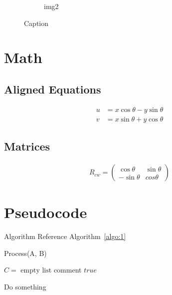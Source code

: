 \documentclass[english]{article}
\begin{document}
\begin{figure}[!htb]
\begin{subfigure}{.45\textwidth}
    \centering
    \caption{img2}
    \label{fig:1.2}
  \end{subfigure}
  \centering
  \caption{Caption}
  \label{fig:1}
\end{figure}


\clearpage
\pagebreak
\section{Math}

\subsection{Aligned Equations}

\begin{align*}
  u & = x \cos\theta - y \sin\theta \\
  v & = x \sin\theta + y \cos\theta
\end{align*}

\subsection{Matrices}

\begin{align*}
  R_{cw} = \begin{pmatrix}
             \cos \theta  & \sin \theta \\
             -\sin \theta & cos \theta
           \end{pmatrix}
\end{align*}

\clearpage
\pagebreak
\section{Pseudocode}

\par Algorithm Reference Algorithm~\ref{algo:1}

\begin{algorithm}
  \caption{Process(A, B)}\label{algo:1}
  \begin{algorithmic}[1]

    \State $C = \text{ empty list}$ \Comment comment
    \State \Return $true$
    \Else

    \State Do something
    \EndWhile

    \EndIf

  \end{algorithmic}
\end{algorithm}
\end{document}
